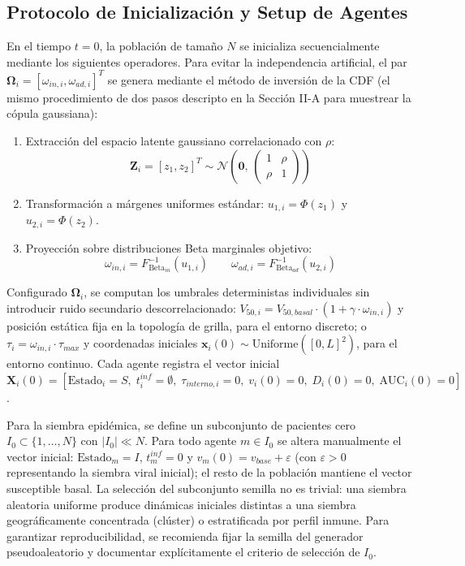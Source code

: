 \documentclass[conference]{IEEEtran}
\begin{document}
\subsection{Protocolo de Inicialización y Setup de Agentes}
En el tiempo $t = 0$, la población de tamaño $N$ se inicializa secuencialmente mediante los siguientes operadores. Para evitar la independencia artificial, el par $\mathbf{\Omega}_i = [\omega_{in,i}, \omega_{ad,i}]^T$ se genera mediante el método de inversión de la CDF (el mismo procedimiento de dos pasos descripto en la Sección II-A para muestrear la cópula gaussiana):
\begin{enumerate}
    \item Extracción del espacio latente gaussiano correlacionado con $\rho$:
    \begin{equation}
    \mathbf{Z}_i = [z_1, z_2]^T \sim \mathcal{N}\!\left(\mathbf{0},\, \begin{pmatrix} 1 & \rho \\ \rho & 1 \end{pmatrix}\right)
    \end{equation}
    \item Transformación a márgenes uniformes estándar: $u_{1,i} = \Phi(z_1)$ y $u_{2,i} = \Phi(z_2)$.
    \item Proyección sobre distribuciones Beta marginales objetivo:
    \begin{equation}
    \omega_{in,i} = F^{-1}_{\text{Beta}_{in}}(u_{1,i}) \qquad \omega_{ad,i} = F^{-1}_{\text{Beta}_{ad}}(u_{2,i})
    \end{equation}
\end{enumerate}
Configurado $\mathbf{\Omega}_i$, se computan los umbrales deterministas individuales sin introducir ruido secundario descorrelacionado: $V_{50,i} = V_{50,basal} \cdot (1 + \gamma \cdot \omega_{in,i})$ y posición estática fija en la topología de grilla, para el entorno discreto; o $\tau_i = \omega_{in,i} \cdot \tau_{max}$ y coordenadas iniciales $\mathbf{x}_i(0) \sim \text{Uniforme}([0, L]^2)$, para el entorno continuo. Cada agente registra el vector inicial $\mathbf{X}_i(0) = [\text{Estado}_i = S,\; t^{inf}_{i} = \emptyset,\; \tau_{interno,i} = 0,\; v_i(0) = 0,\; D_i(0) = 0,\; \text{AUC}_i(0) = 0]$.

Para la siembra epidémica, se define un subconjunto de pacientes cero $I_0 \subset \{1, \dots, N\}$ con $|I_0| \ll N$. Para todo agente $m \in I_0$ se altera manualmente el vector inicial: $\text{Estado}_m = I$, $t^{inf}_{m} = 0$ y $v_m(0) = v_{base} + \varepsilon$ (con $\varepsilon > 0$ representando la siembra viral inicial); el resto de la población mantiene el vector susceptible basal. La selección del subconjunto semilla no es trivial: una siembra aleatoria uniforme produce dinámicas iniciales distintas a una siembra geográficamente concentrada (clúster) o estratificada por perfil inmune. Para garantizar reproducibilidad, se recomienda fijar la semilla del generador pseudoaleatorio y documentar explícitamente el criterio de selección de $I_0$.
\end{document}

